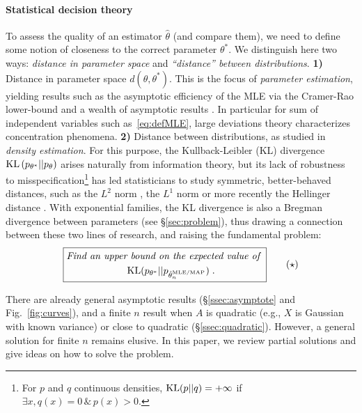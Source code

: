 \documentclass[twoside]{article}
\newcommand{\logpart}{A}
\newcommand{\nat}{\theta}
\begin{document}
\paragraph{Statistical decision theory}
To assess the quality of an estimator $\hat \nat$ (and compare them), we need to define some notion of closeness to the correct parameter $\nat^*$.
We distinguish here two ways: \textit{distance in parameter space} and \textit{``distance'' between distributions}.
{\bf 1)} Distance in parameter space $d(\nat,\nat^*)$. This is the focus of \emph{parameter estimation}, yielding results such as the asymptotic efficiency of the MLE via the Cramer-Rao lower-bound \citep{aitken1942estimation} and a wealth of asymptotic results \citep{vdv1998asymptotic}.
In particular for sum of independent variables such as~\eqref{eq:defMLE}, large deviations theory \citep{varadhan1984large} characterizes concentration phenomena.
{\bf 2)} Distance between distributions, as studied in \emph{density estimation}.
For this purpose, the Kullback-Leibler (KL) divergence $\KL\paren{p_{\nat^*} || p_{\nat} }$  arises naturally from information theory,
but its lack of robustness to misspecification\footnote{
For $p$ and $q$ continuous densities,
$\mathrm{KL}(p||q) = +\infty$ if $\exists x, q(x)=0 \, \& \, p(x)>0$.
}
has led statisticians to study symmetric, better-behaved distances, such as the $L^2$ norm \citep[\S1.2]{tsybakov2009introduction}, the $L^1$ norm \citep{devroye2001combinatorial} or more recently the Hellinger distance \citep{baraud2017new}.
With exponential families, the KL divergence is also a Bregman divergence between parameters (see \S\ref{sec:problem}), thus drawing a connection between these two lines of research,
and raising the fundamental problem:
\begin{equation}
\boxed{
\begin{aligned}
	\textit{Find an upper}&\textit{ bound on the expected value of } \\
	&\KL(p_{\nat^*} || p_{\hat \nat_n^\text{MLE/MAP} }) \; .
\end{aligned}
}
\tag{$\star$}
\label{problem}
\end{equation}

There are already general asymptotic results (\S\ref{ssec:asymptote} and Fig.~\ref{fig:curves}), and a finite $n$ result when $\logpart$ is quadratic (e.g., $X$ is Gaussian with known variance)
or close to quadratic (\S\ref{ssec:quadratic}).
However, a  general solution for finite $n$ remains elusive. 
In this paper, we review partial solutions and give ideas on how to solve the problem.
\end{document}
